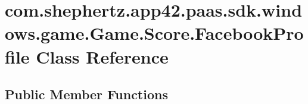 \hypertarget{classcom_1_1shephertz_1_1app42_1_1paas_1_1sdk_1_1windows_1_1game_1_1_game_1_1_score_1_1_facebook_profile}{\section{com.\+shephertz.\+app42.\+paas.\+sdk.\+windows.\+game.\+Game.\+Score.\+Facebook\+Profile Class Reference}
\label{classcom_1_1shephertz_1_1app42_1_1paas_1_1sdk_1_1windows_1_1game_1_1_game_1_1_score_1_1_facebook_profile}
}
\subsection*{Public Member Functions}
